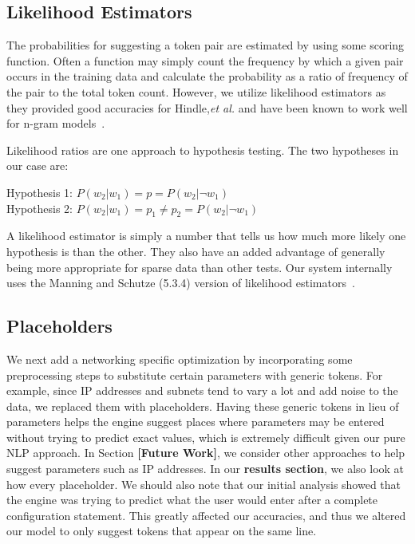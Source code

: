 \subsection{Likelihood Estimators} 

The probabilities for suggesting a token pair are estimated by using some scoring function. Often a function may simply count the frequency by which a given pair occurs in the training data and calculate the probability as a ratio of frequency of the pair to the total token count. However, we utilize likelihood estimators as they provided good accuracies for Hindle,\textit{et al.} and have been known to work well for n-gram models~\cite{manning}.

Likelihood ratios are one approach to hypothesis testing. The two hypotheses in our case are:

\begin{center}
Hypothesis 1: $P(w_2|w_1) = p = P(w_2|\neg w_1)$ \\
Hypothesis 2: $P(w_2|w_1) = p_1 \neq p_2 = P(w_2|\neg w_1)$	\\	
\end{center}

A likelihood estimator is simply a number that tells us how much more likely one hypothesis is than the other. They also have an added advantage of generally being more appropriate for sparse data than other tests. Our system internally uses the Manning and Schutze (5.3.4) version of likelihood estimators~\cite{manning}.

\subsection{Placeholders}
We next add a networking specific optimization by incorporating some preprocessing steps to substitute certain parameters with generic tokens. For example, since IP addresses and subnets tend to vary a lot and add noise to the data, we replaced them with placeholders. Having these generic tokens in lieu of parameters helps the engine suggest places where parameters may be entered without trying to predict exact values, which is extremely difficult given our pure NLP approach. In Section \textbf{[Future Work]}, we consider other approaches to help suggest parameters such as IP addresses. In our \textbf{results section}, we also look at how every placeholder. We should also note that our initial analysis showed that the engine was trying to predict what the user would enter after a complete configuration statement. This greatly affected our accuracies, and thus we altered our model to only suggest tokens that appear on the same line.\\

